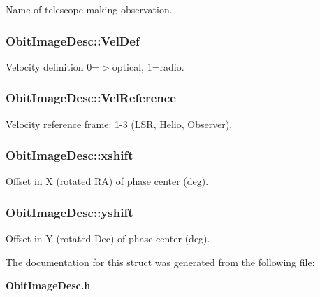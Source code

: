 Name of telescope making observation. 

\subsubsection{ {\bf Obit\-Image\-Desc::Vel\-Def}}\label{structObitImageDesc_o37}


Velocity definition 0=$>$optical, 1=radio. 

\subsubsection{ {\bf Obit\-Image\-Desc::Vel\-Reference}}\label{structObitImageDesc_o36}


Velocity reference frame: 1-3 (LSR, Helio, Observer). 

\subsubsection{ {\bf Obit\-Image\-Desc::xshift}}\label{structObitImageDesc_o12}


Offset in X (rotated RA) of phase center (deg). 

\subsubsection{ {\bf Obit\-Image\-Desc::yshift}}\label{structObitImageDesc_o13}


Offset in Y (rotated Dec) of phase center (deg). 



The documentation for this struct was generated from the following file:\begin{CompactItemize}
\item 
{\bf Obit\-Image\-Desc.h}\end{CompactItemize}
